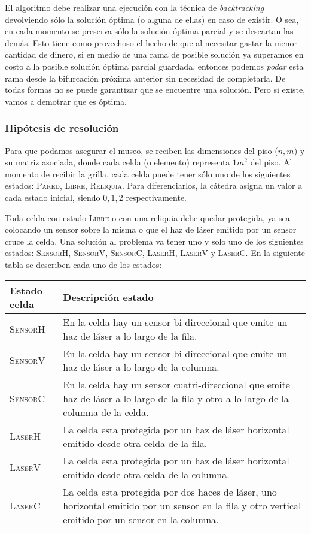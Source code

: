 \documentclass[11pt, a4paper, twoside]{article}
\begin{document}
El algoritmo debe realizar una ejecución con la técnica de \textit{backtracking}
devolviendo sólo la solución óptima (o alguna de ellas) en caso de existir.
O sea, en cada momento se preserva sólo la solución óptima parcial y se descartan las demás.
Esto tiene como provechoso el hecho de que al necesitar gastar la menor cantidad de dinero, si en medio
de una rama de posible solución ya superamos en costo a la posible solución óptima parcial guardada,
entonces podemos \textit{podar} esta rama desde la bifurcación próxima anterior sin necesidad
de completarla. De todas formas no se puede garantizar que se encuentre una solución.
Pero si existe, vamos a demotrar que es óptima.

\subsubsection{Hipótesis de resolución}

Para que podamos asegurar el museo, se reciben las dimensiones del piso ($n, m$) y su matriz asociada, donde
cada celda (o elemento) representa $1m^2$ del piso. Al momento de recibir la grilla, cada celda puede tener
sólo uno de los siguientes estados: \textsc{Pared}, \textsc{Libre}, \textsc{Reliquia}. Para diferenciarlos,
la cátedra asigna un valor a cada estado inicial, siendo $0, 1, 2$ respectivamente.

Toda celda con estado \textsc{Libre} o con una reliquia debe quedar protegida,
ya sea colocando un sensor sobre la misma o que el haz de láser emitido por un
sensor cruce la celda. Una solución al problema va tener uno y solo uno
de los siguientes estados: \textsc{SensorH}, \textsc{SensorV}, \textsc{SensorC},
\textsc{LaserH}, \textsc{LaserV} y \textsc{LaserC}.
En la siguiente tabla se describen cada uno de los estados:

\begin{center}
	\begin{tabular}{ l p{8cm} }
		\textbf{Estado celda} & \textbf{Descripción estado} \\
		\hline
		\textsc{SensorH} & En la celda hay un sensor bi-direccional que emite un haz de láser a lo largo de la fila.\\
		\textsc{SensorV} & En la celda hay un sensor bi-direccional que emite un haz de láser a lo largo de la columna.\\
		\textsc{SensorC} & En la celda hay un sensor cuatri-direccional que emite haz de láser a lo largo de la fila y otro a lo largo de la columna de la celda.\\
		\textsc{LaserH}  & La celda esta protegida por un haz de láser horizontal emitido desde otra celda de la fila.\\
		\textsc{LaserV}  & La celda esta protegida por un haz de láser horizontal emitido desde otra celda de la columna.\\
		\textsc{LaserC}  & La celda esta protegida por dos haces de láser, uno horizontal emitido por un sensor en la fila y otro vertical emitido por un sensor en la columna.
	\end{tabular}
\end{center}
\end{document}
